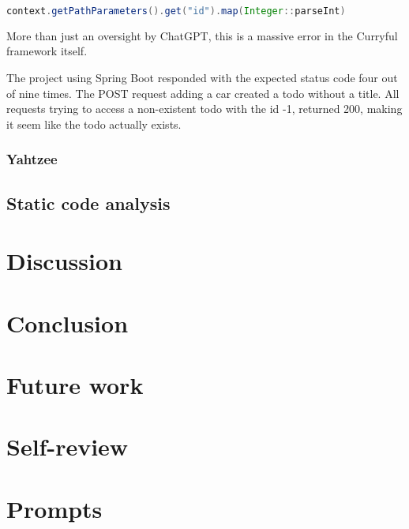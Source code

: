 \documentclass[a4paper]{article}
\begin{document}
\begin{lstlisting}[language=Java, caption=ChatGPT generated code parsing to int
		without precaution, captionpos=b, label=lst:curryful-parse-error]
context.getPathParameters().get("id").map(Integer::parseInt)
\end{lstlisting}

\noindent More than just an oversight by ChatGPT, this is a massive error in the
Curryful framework itself.
\newline

\noindent The project using Spring Boot responded with the expected status code
four out of nine times. The POST request adding a car created a todo without a
title. All requests trying to access a non-existent todo with the id -1,
returned 200, making it seem like the todo actually exists.

\subsubsection{Yahtzee}

\subsection{Static code analysis}

\section{Discussion}

\section{Conclusion}

\section{Future work}

\section{Self-review}

\newpage
\listoffigures

\newpage
\lstlistoflistings

\newpage
\listoftables

\newpage


\newpage
\appendix

\section{Prompts}
\end{document}
